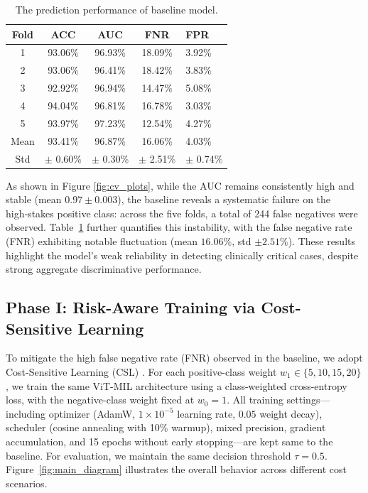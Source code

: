 \documentclass[sigconf,review,anonymous]{acmart}
\theoremstyle{remark}
\begin{document}
\begin{table}[htbp]
    \caption{The prediction performance of baseline model.}
    \label{tab:cv_results}
    \begin{tabular}{ccccl}
    \toprule
    Fold & ACC & AUC & FNR & FPR \\
    \midrule
    1 & 93.06\% & 96.93\% & 18.09\% & 3.92\% \\
    2 & 93.06\% & 96.41\% & 18.42\% & 3.83\% \\
    3 & 92.92\% & 96.94\% & 14.47\% & 5.08\% \\
    4 & 94.04\% & 96.81\% & 16.78\% & 3.03\% \\
    5 & 93.97\% & 97.23\% & 12.54\% & 4.27\% \\
    \midrule
    Mean & 93.41\% & 96.87\% & 16.06\% & 4.03\% \\
    Std & $\pm$ 0.60\% & $\pm$ 0.30\% & $\pm$ 2.51\% & $\pm$ 0.74\% \\
    \bottomrule
    \end{tabular}
    \vskip -0.1in
\end{table}

As shown in Figure \ref{fig:cv_plots}, while the AUC remains consistently high and stable (mean $0.97 \pm 0.003$), the baseline reveals a systematic failure on the high‑stakes positive class: across the five folds, a total of 244 false negatives were observed. Table~\ref{tab:cv_results} further quantifies this instability, with the false negative rate (FNR) exhibiting notable fluctuation (mean $16.06\%$, std $\pm 2.51\%$). These results highlight the model's weak reliability in detecting clinically critical cases, despite strong aggregate discriminative performance.







\subsection{Phase I: Risk-Aware Training via Cost-Sensitive Learning}
\label{sec:phase1_results}

To mitigate the high false negative rate (FNR) observed in the baseline, we adopt Cost-Sensitive Learning (CSL) \cite{el2010foundations,zadrozny2004learning}. For each positive-class weight $w_{1} \in \{5,10,15,20\}$, we train the same ViT-MIL architecture using a class-weighted cross-entropy loss, with the negative-class weight fixed at $w_{0}=1$. All training settings—including optimizer (AdamW, $1\times10^{-5}$ learning rate, $0.05$ weight decay), scheduler (cosine annealing with 10\% warmup), mixed precision, gradient accumulation, and 15 epochs without early stopping—are kept same to the baseline. For evaluation, we maintain the same decision threshold $\tau = 0.5$. Figure~\ref{fig:main_diagram} illustrates the overall behavior across different cost scenarios.
\end{document}
